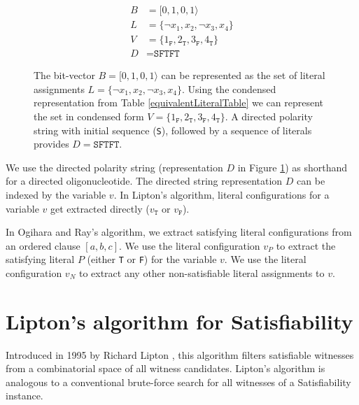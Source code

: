 \begin{figure}[htbp]
\begin{center}

	\begin{align*}
	B &= [0, 1, 0, 1 \rangle \\
	L &= \{ \neg x_1, x_2, \neg x_3, x_4 \} \\
	V &= \{ 1_{\texttt{F}}, 2_{\texttt{T}}, 3_{\texttt{F}}, 4_{\texttt{T}} \} \\
	D &= \texttt{SFTFT} 
	\end{align*}

\caption{The bit-vector $B = [0, 1, 0, 1 \rangle$ can be represented as the set of literal assignments $L = \{ \neg x_1, x_2, \neg x_3, x_4 \}$.  Using the condensed representation from Table \ref{equivalentLiteralTable} we can represent the set in condensed form $V = \{ 1_{\texttt{F}}, 2_{\texttt{T}}, 3_{\texttt{F}}, 4_{\texttt{T}} \}$.  A directed polarity string with initial sequence (\texttt{S}), followed by a sequence of literals provides $D = \texttt{SFTFT}$.}
\label{equivalentWitnessRepresentations}
\end{center}
\end{figure}

\FloatBarrier

We use the directed polarity string (representation $D$ in Figure \ref{equivalentWitnessRepresentations}) as shorthand for a directed oligonucleotide.  The directed string representation $D$ can be indexed by the variable $v$.  In Lipton's algorithm, literal configurations for a variable $v$ get extracted directly ($v_{\texttt{T}}$ or $v_{\texttt{F}}$).

In Ogihara and Ray's algorithm, we extract satisfying literal configurations from an ordered clause $[a, b, c]$.  We use the literal configuration $v_P$ to extract the satisfying literal $P$ (either \texttt{T} or \texttt{F}) for the variable $v$.  We use the literal configuration $v_N$ to extract any other non-satisfiable literal assignments to $v$.

\section{Lipton's algorithm for {\sc Satisfiability}}


Introduced in 1995 by Richard Lipton \cite{Lipton95usingdna}, this algorithm filters satisfiable witnesses from a combinatorial space of all witness candidates.  Lipton's algorithm is analogous to a conventional brute-force search for all witnesses of a {\sc Satisfiability} instance.

